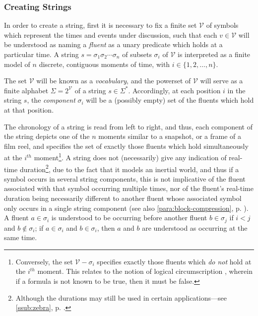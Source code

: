 \documentclass[a4paper,12pt,leqno]{article}
\newcommand{\V}{\mathcal{V}}
\newcommand{\nb}[1]{{\color{red}[NB\footnote{{\color{red}#1}}]}}
\begin{document}
\subsubsection{Creating Strings}\label{ssub:creating}
In order to create a string, first it is necessary to fix a finite set $\V$ of symbols which represent the times and events under discussion, such that each $v \in \V$ will be understood as naming a \textit{fluent} as a unary predicate which holds at a particular time. A string $s = \sigma_1\sigma_2\cdots\sigma_n$ of subsets $\sigma_i$ of $\V$ is interpreted as a finite model of $n$ discrete, contiguous moments of time, with $i \in \{1, 2, \ldots, n\}$.

The set $\V$ will be known as a \textit{vocabulary}, and the powerset of $\V$ will serve as a finite alphabet $\Sigma = 2^{\V}$ of a string $s \in \Sigma^*$. Accordingly, at each position $i$ in the string $s$, the \textit{component} $\sigma_i$ will be a (possibly empty) set of the fluents which hold at that position.

The chronology of a string is read from left to right, and thus, each component of the string depicts one of the $n$ moments similar to a snapshot, or a frame of a film reel, and specifies the set of exactly those fluents which hold simultaneously at the $i^{th}$ moment\footnote{Conversely, the set $\V-\sigma_i$ specifies exactly those fluents which \textit{do not} hold at the $i^{th}$ moment. This relates to the notion of logical circumscription \citep{mccarthy1980circumscription}, wherein if a formula is not known to be true, then it must be false.}. A string does not (necessarily) give any indication of real-time duration\footnote{Although the durations may still be used in certain applications---see \cref{ssub:zebra}, p. \pageref{tab:rel-durations}.}, due to the fact that it models an inertial world, and thus if a symbol occurs in several string components, this is not implicative of the fluent associated with that symbol occurring multiple times, nor of the fluent's real-time duration being necessarily different to another fluent whose associated symbol only occurs in a single string component (see also \cref{para:block-compression}, p. \pageref{para:block-compression}). A fluent $a \in \sigma_i$ is understood to be occurring before another fluent $b \in \sigma_j$ if $i < j$ and $b \notin \sigma_i$; if $a \in \sigma_i$ and $b \in \sigma_i$, then $a$ and $b$ are understood as occurring at the same time.%
\end{document}
